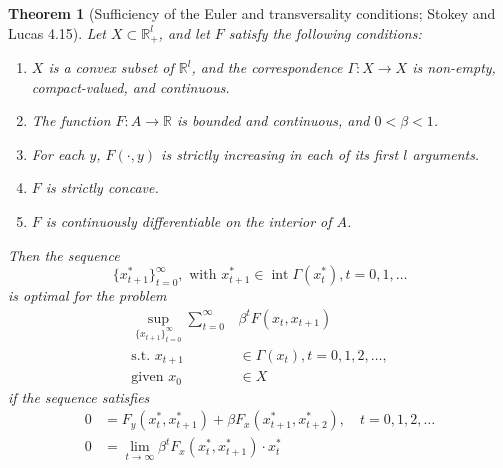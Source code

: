 \documentclass[11pt]{article}
\newtheorem*{theorem}{Theorem}
\newcommand{\R}{\mathbb{R}}
\begin{document}
\begin{theorem}[Sufficiency of the Euler and transversality conditions; Stokey and Lucas 4.15]
Let $X \subset \R^l_+$, and let $F$ satisfy the following conditions:
\begin{enumerate}
\item $X$ is a convex subset of $\R^l$, and the correspondence $\Gamma: X \to X $ is non-empty, compact-valued, and continuous.
\item The function $F: A \to \R$ is bounded and continuous, and $0 < \beta < 1$.
\item For each $y$, $F(\cdot, y)$ is strictly increasing in each of its first $l$ arguments.
\item $F$ is strictly concave.
\item $F$ is continuously differentiable on the interior of $A$.
\end{enumerate}
Then the sequence
\[
\{x^*_{t + 1}\}^\infty_{t = 0}, \text{ with } x^*_{t + 1} \in \operatorname{int} \Gamma (x^*_t), t = 0, 1, \ldots
\]
is optimal for the problem
\begin{align*}
\sup_{\{x_{t + 1}\}^\infty_{t = 0}} \sum^\infty_{t = 0} & \beta^t F(x_t, x_{t + 1})\\ 
\text{s.t. } x_{t + 1} &\in \Gamma(x_t), t = 0, 1, 2,\ldots,\tag{SP}\label{SP}\\
\text{given } x_0 & \in X
\end{align*}
if the sequence satisfies
\begin{align*}
0 &= F_y(x_t^\ast, x_{t + 1}^\ast) + \beta F_x(x_{t + 1}^\ast, x_{t + 2}^\ast), \quad t = 0, 1, 2,\ldots\tag{2}\label{LS4.15:2}\\
0 &= \lim_{t \to \infty} \beta^t F_x(x_t^\ast, x_{t + 1}^\ast) \cdot x_t^\ast \tag{3}\label{LS4.15:3}
\end{align*}
\end{theorem}
\end{document}
